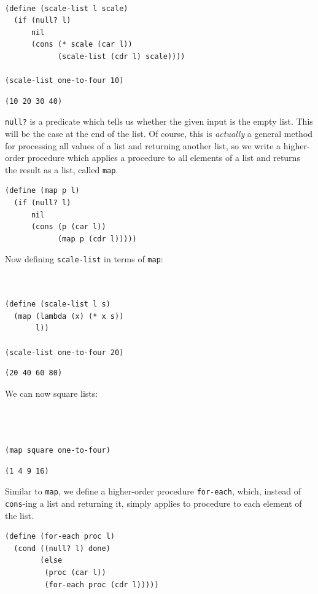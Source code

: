 \documentclass[9pt]{report}
\begin{document}
\begin{verbatim}

(define (scale-list l scale)
  (if (null? l)
      nil
      (cons (* scale (car l))
            (scale-list (cdr l) scale))))

(scale-list one-to-four 10)
\end{verbatim}

\begin{verbatim}
(10 20 30 40)
\end{verbatim}


\texttt{null?} is a predicate which tells us whether the given input is
the empty list. This will be the case at the end of the list.
Of course, this is \emph{actually} a general method for processing all
values of a list and returning another list, so we write a
higher-order procedure which applies a procedure to all elements
of a list and returns the result as a list, called \texttt{map}.

\begin{verbatim}
(define (map p l)
  (if (null? l)
      nil
      (cons (p (car l))
            (map p (cdr l)))))
\end{verbatim}

Now defining \texttt{scale-list} in terms of \texttt{map}:

\begin{verbatim}


(define (scale-list l s)
  (map (lambda (x) (* x s))
       l))

(scale-list one-to-four 20)
\end{verbatim}

\begin{verbatim}
(20 40 60 80)
\end{verbatim}


We can now square lists:
\begin{verbatim}



(map square one-to-four)
\end{verbatim}

\begin{verbatim}
(1 4 9 16)
\end{verbatim}


Similar to \texttt{map}, we define a higher-order procedure \texttt{for-each},
which, instead of \texttt{cons}-ing a list and returning it, simply
applies to procedure to each element of the list.

\begin{verbatim}
(define (for-each proc l)
  (cond ((null? l) done)
        (else
         (proc (car l))
         (for-each proc (cdr l)))))
\end{verbatim}
\end{document}
